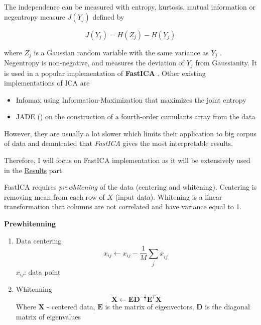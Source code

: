 \documentclass[12pt,]{book}
\providecommand{\tightlist}{%
  \setlength{\itemsep}{0pt}\setlength{\parskip}{0pt}}
\theoremstyle{definition}
\theoremstyle{definition}
\theoremstyle{definition}
\theoremstyle{remark}
\begin{document}
The independence can be measured with entropy, kurtosis, mutual
information or negentropy measure \(J(Y_j )\) \citep{Hyvarinen2000}
defined by

\begin{equation}
J(Y_j ) = H(Z_j ) − H(Y_j ) \label{eq:negentropy}
\end{equation}

where \(Z_j\) is a Gaussian random variable with the same variance as
\(Y_j\) . Negentropy is non-negative, and measures the deviation of
\(Y_j\) from Gaussianity. It is used in a popular implementation of
\textbf{FastICA} \citep{Hyvarinen2000}. Other existing implementations
of ICA are

\begin{itemize}
\tightlist
\item
  Infomax \citep{Bell1995} using Information-Maximization that maximizes
  the joint entropy
\item
  JADE (\citet{Cardoso1993}) on the construction of a fourth-order
  cumulants array from the data
\end{itemize}

However, they are usually a lot slower which limits their application to
big corpus of data and \citet{Teschendorff2007} demntrated that
\emph{FastICA} gives the most interpretable results.

Therefore, I will focus on FastICA implementation as it will be
extensively used in the \protect\hyperlink{results}{Results} part.

FastICA requires \emph{prewhitening} of the data (centering and
whitening). Centering is removing mean from each row of \(X\) (input
data). Whitening is a linear transformation that columns are not
correlated and have variance equal to 1.

\textbf{Prewhitenning }

\begin{enumerate}
\def\labelenumi{\arabic{enumi}.}
\tightlist
\item
  Data centering \begin{equation}
    x_{ij} \leftarrow x_{ij} - {\frac {1}{M}}\sum_{j^{\prime }}x_{ij^{\prime }}  \label{eq:cent}
    \end{equation} \(x_{ij}\): data point
\item
  Whitenning \begin{equation}
   \mathbf {X} \leftarrow \mathbf {E}\mathbf {D} ^{-\frac{1}{2}}\mathbf {E} ^{T}\mathbf {X} \label{eq:whit}
   \end{equation} Where \(\mathbf {X}\) - centered data, \(\mathbf {E}\)
  is the matrix of eigenvectors, \(\mathbf{D}\) is the diagonal matrix
  of eigenvalues
\end{enumerate}
\end{document}
